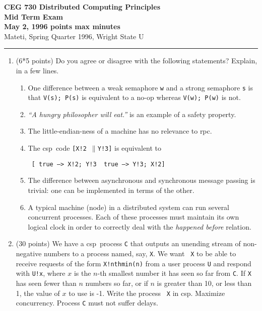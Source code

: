 \def\CSP{{\sc csp}}
\def\RPC{{\sc rpc}}
\def\fat{\framebox[1mm]{\rule{0mm}{2mm}}}
\def\co{{\bf co}}
\def\oc{{\bf oc}}
\def\pa{{$\parallel$}}
\def\lb{$\langle$}
\def\rb{$\rangle$}
\def\ra{$\rightarrow$}
\def\await{{\bf await}}
\def\rar{\rightarrow}
\def\pr{$\parallel$}

\parindent=0pt


{\bf CEG 730 Distributed Computing Principles\\[5pt]
\large Mid Term Exam\\[10pt]
May 2, 1996  points max  minutes\\
}
\bigskip
{Mateti,  Spring Quarter 1996, Wright State U}\\[-5pt]
\hrule

\begin{enumerate}

\item (6*5 points)
Do you agree or  disagree with the following statements?
Explain, in a few lines.

\begin{enumerate}

\item One difference between a weak semaphore {\tt w} and a strong
semaphore {\tt s} is that {\tt V(s); P(s)} is equivalent to a no-op
whereas {\tt V(w); P(w)} is not.

\item
{\sl ``A hungry philosopher will eat.''} is an example of a safety
property.

\item
The little-endian-ness of a machine has no relevance to \RPC.

\item
The \CSP\ code {\tt [X!2 \pr Y!3]} is equivalent to \par
{\tt
[  true --> X!2; Y!3 \quad \fat\ \quad true --> Y!3; X!2]
}

\item
The difference between asynchronous and synchronous message passing is
trivial: one can be implemented in terms of the other.


\item
A typical machine (node) in a distributed system can run several
concurrent processes.  Each of these processes must maintain its own
logical clock in order to correctly deal with the {\sl happened
before} relation.
\end{enumerate}


\item (30 points)
We have a \CSP\ process {\tt C} that outputs an unending stream of
non-negative numbers to a process named, say, {\tt X}.  We want {\tt
X} to be able to receive requests of the form {\tt X!nthmin(n)} from a
user process {\tt U} and respond with {\tt U!x}, where $x$ is the
$n$-th smallest number it has seen so far from {\tt C}.  If {\tt X}
has seen fewer than $n$ numbers so far, or if $n$ is greater than 10,
or less than 1, the value of $x$ to use is -1.  Write the process {\tt
X} in \CSP.  Maximize concurrency.  Process {\tt C} must not suffer
delays.



\end{enumerate}

